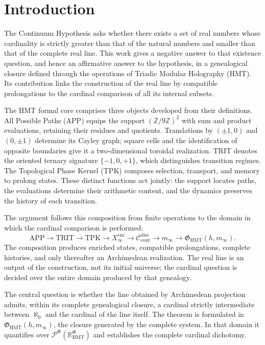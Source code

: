 \section{Introduction}
\label{sec:introduccion-ch}

The Continuum Hypothesis asks whether there exists a set of real numbers
whose cardinality is strictly greater than that of the natural numbers and
smaller than that of the complete real line. This work gives a negative answer
to that existence question, and hence an affirmative answer to the hypothesis,
in a genealogical closure defined through the operations of Triadic Modular
Holography (HMT). Its contribution links the construction of the real line by
compatible prolongations to the cardinal comparison of all its internal
subsets.

The HMT formal core comprises three objects developed from their definitions.
All Possible Paths (APP) equips the support \((\mathbb Z/9\mathbb Z)^2\)
with sum and product evaluations, retaining their residues and quotients.
Translations by \((\pm1,0)\) and \((0,\pm1)\) determine its Cayley graph;
square cells and the identification of opposite boundaries give it a
two-dimensional toroidal realization. TRIT denotes the oriented ternary
signature \(\{-1,0,+1\}\), which distinguishes transition regimes. The
Topological Phase Kernel (TPK) composes selection, transport, and memory to
prolong states. These distinct functions act jointly: the support locates
paths, the evaluations determine their arithmetic content, and the dynamics
preserves the history of each transition.

The argument follows this composition from finite operations to the domain in
which the cardinal comparison is performed:
\[
 \mathrm{APP}\longrightarrow\mathrm{TRIT}\longrightarrow\mathrm{TPK}
 \longrightarrow X_\infty^{\mathrm{enr}}
 \longrightarrow\mathcal C_{\mathrm{cont}}^{\mathrm{disc}}
 \longrightarrow m_\infty
 \longrightarrow\mathfrak G_{\mathrm{HMT}}(h,m_\infty).
\]
The composition produces enriched states, compatible prolongations, complete
histories, and only thereafter an Archimedean realization. The real line is an
output of the construction, not its initial universe; the cardinal question
is decided over the entire domain produced by that genealogy.

The central question is whether the line obtained by Archimedean projection admits,
within its complete genealogical closure, a cardinal strictly intermediate
between \(\aleph_0\) and the cardinal of the line itself. The theorem is
formulated in \(\mathfrak G_{\mathrm{HMT}}(h,m_\infty)\), the closure generated
by the complete system. In that domain it quantifies over
\(\mathcal P^{\mathfrak G}(\mathbb R_{\mathrm{HMT}}^{\mathfrak G})\) and
establishes the complete cardinal dichotomy.


